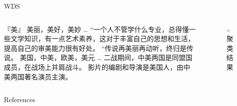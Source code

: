 \documentclass[aspectratio=169]{ctexbeamer}
\begin{document}
\begin{frame}{WDS}
    \begin{columns}
        \begin{column}{0.5\textwidth}
            \begin{outline}
                \1 『美』
                    \2 美丽，美好，美妙  \dots
                    \3 “一个人不管学什么专业，总得懂一些文学知识，有一点艺术素养，这对于丰富自己的思想和生活，提高自己的审美能力很有好处。
                    \3 “传说再美丽再动听，终归是传说。
                    \2 美国，中美，欧美，美元 \dots
                    \3 二战期间，中美两国是同盟国成员，在战场上并肩战斗。
                    \3 影片的编剧和导演是美国人，由中美两国著名演员主演。
            \end{outline}
        \end{column}
        \begin{column}{0.5\textwidth}
            \begin{figure}[h]
                \centering
                \includegraphics[width=\linewidth]{../report/image1.png}
                \caption{聚类结果}
                \label{fig:wsd}
            \end{figure}
        \end{column}
    \end{columns}
\end{frame}

\begin{frame}[allowframebreaks]{References}
    \renewcommand{\section}[2]{}
    
      
\end{frame}
\end{document}
